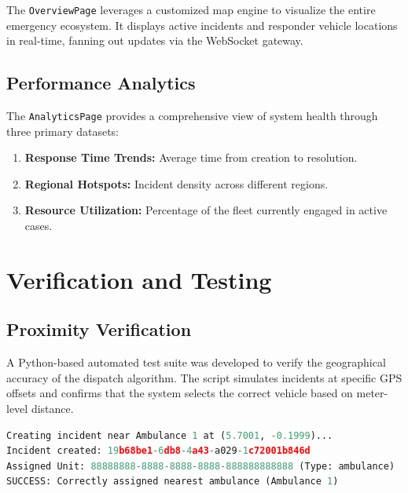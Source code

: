 \documentclass[12pt,a4paper]{report}
\begin{document}
The \texttt{OverviewPage} leverages a customized map engine to visualize the entire emergency ecosystem. It displays active incidents and responder vehicle locations in real-time, fanning out updates via the WebSocket gateway.

\section{Performance Analytics}

The \texttt{AnalyticsPage} provides a comprehensive view of system health through three primary datasets:
\begin{enumerate}
    \item \textbf{Response Time Trends:} Average time from creation to resolution.
    \item \textbf{Regional Hotspots:} Incident density across different regions.
    \item \textbf{Resource Utilization:} Percentage of the fleet currently engaged in active cases.
\end{enumerate}

\newpage

\chapter{Verification and Testing}

\section{Proximity Verification}

A Python-based automated test suite was developed to verify the geographical accuracy of the dispatch algorithm. The script simulates incidents at specific GPS offsets and confirms that the system selects the correct vehicle based on meter-level distance.

\begin{lstlisting}[language=python, caption=Proximity Verification Result]
Creating incident near Ambulance 1 at (5.7001, -0.1999)...
Incident created: 19b68be1-6db8-4a43-a029-1c72001b846d
Assigned Unit: 88888888-8888-8888-8888-888888888888 (Type: ambulance)
SUCCESS: Correctly assigned nearest ambulance (Ambulance 1)
\end{lstlisting}
\end{document}
